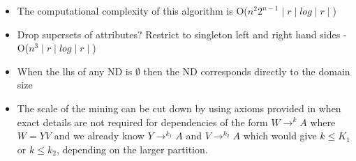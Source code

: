 {\renewcommand{\baselinestretch}{1}
\begin{figure}[ht]
\end{figure}
}

\begin{itemize}
\item The computational complexity of this algorithm is O($n^2 2^{n-1}
\mid r \mid log \mid r \mid$)
\item Drop supersets of attributes? Restrict to singleton left and right
hand sides - O($n^3\mid r \mid log \mid r \mid$)
\item When the lhs of any ND is $\emptyset$ then the ND corresponds
directly to the domain size
\item The scale of the mining can be cut down by using axioms provided
in \cite{gm85b,gm85a} when exact details are not required for
dependencies of the form $W \to^k A$ where $W = YV$ and we already
know $Y \to^{k_1} A$ and $V \to^{k_2} A$ which would give $k \le K_1$
or $k \le k_2$, depending on the larger partition.
\end{itemize}


